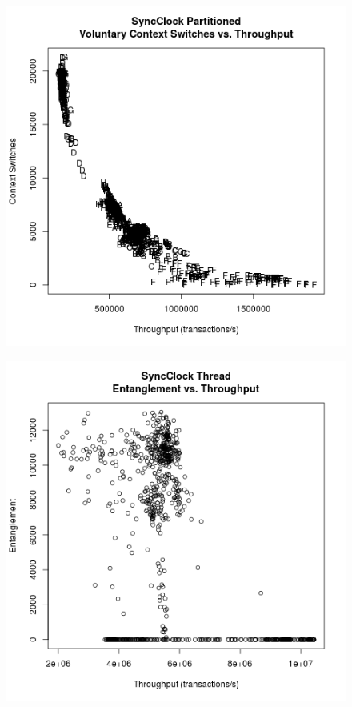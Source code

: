 \begin{figure}
\center
\includegraphics[height=.25\textheight]{sync_partitioned_throughput_context.png}
\caption{\label{sync_partitioned_throughput_context}}
\end{figure}

\clearpage

\begin{figure}
\center
\includegraphics[height=.25\textheight]{sync_thread_throughput_entanglement.png}
\caption{\label{sync_thread_throughput_entanglement}}
\end{figure}

